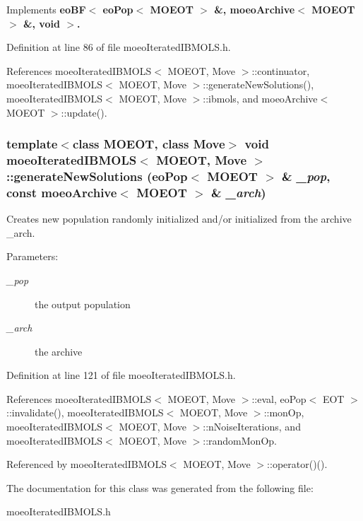 Implements \bf{eo\-BF$<$ eo\-Pop$<$ MOEOT $>$ \&, moeo\-Archive$<$ MOEOT $>$ \&, void $>$}.

Definition at line 86 of file moeo\-Iterated\-IBMOLS.h.

References moeo\-Iterated\-IBMOLS$<$ MOEOT, Move $>$::continuator, moeo\-Iterated\-IBMOLS$<$ MOEOT, Move $>$::generate\-New\-Solutions(), moeo\-Iterated\-IBMOLS$<$ MOEOT, Move $>$::ibmols, and moeo\-Archive$<$ MOEOT $>$::update().
\subsubsection{\setlength{\rightskip}{0pt plus 5cm}template$<$class MOEOT, class Move$>$ void \bf{moeo\-Iterated\-IBMOLS}$<$ MOEOT, Move $>$::generate\-New\-Solutions (\bf{eo\-Pop}$<$ MOEOT $>$ \& {\em \_\-pop}, const \bf{moeo\-Archive}$<$ MOEOT $>$ \& {\em \_\-arch})\hspace{0.3cm}{\tt  [inline, private]}}\label{classmoeoIteratedIBMOLS_2826cf283f6670b3c46da5ac6b6def18}


Creates new population randomly initialized and/or initialized from the archive \_\-arch. 

\begin{Desc}
\item[Parameters:]
\begin{description}
\item[{\em \_\-pop}]the output population \item[{\em \_\-arch}]the archive \end{description}
\end{Desc}


Definition at line 121 of file moeo\-Iterated\-IBMOLS.h.

References moeo\-Iterated\-IBMOLS$<$ MOEOT, Move $>$::eval, eo\-Pop$<$ EOT $>$::invalidate(), moeo\-Iterated\-IBMOLS$<$ MOEOT, Move $>$::mon\-Op, moeo\-Iterated\-IBMOLS$<$ MOEOT, Move $>$::n\-Noise\-Iterations, and moeo\-Iterated\-IBMOLS$<$ MOEOT, Move $>$::random\-Mon\-Op.

Referenced by moeo\-Iterated\-IBMOLS$<$ MOEOT, Move $>$::operator()().

The documentation for this class was generated from the following file:\begin{CompactItemize}
\item 
moeo\-Iterated\-IBMOLS.h\end{CompactItemize}
